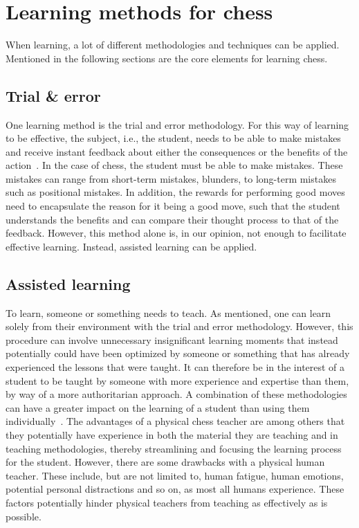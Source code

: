 \section{Learning methods for chess}\label{sec:learning-methods-for-chess}

When learning, a lot of different methodologies and techniques can be applied.
Mentioned in the following sections are the core elements for learning chess.


\subsection{Trial \& error}\label{subsec:trial-and-error}

One learning method is the trial and error methodology.
For this way of learning to be effective, the subject, i.e., the student, needs to be able to make mistakes and receive
instant feedback about either the consequences or the benefits of the action~\cite{li2023}.
In the case of chess, the student must be able to make mistakes.
These mistakes can range from short-term mistakes, blunders, to long-term mistakes such as positional mistakes.
In addition, the rewards for performing good moves need to encapsulate the reason for it being a good move, such that
the student understands the benefits and can compare their thought process to that of the feedback.
However, this method alone is, in our opinion, not enough to facilitate effective learning.
Instead, assisted learning can be applied.


\subsection{Assisted learning}\label{subsec:assisted-learning}

To learn, someone or something needs to teach.
As mentioned, one can learn solely from their environment with the trial and error methodology.
However, this procedure can involve unnecessary insignificant learning moments that instead potentially could have been
optimized by someone or something that has already experienced the lessons that were taught.
It can therefore be in the interest of a student to be taught by someone with more experience and expertise than them,
by way of a more authoritarian approach.
A combination of these methodologies can have a greater impact on the learning of a student than using them
individually~\cite{swann2012}.
The advantages of a physical chess teacher are among others that they potentially have experience in both the material
they are teaching and in teaching methodologies, thereby streamlining and focusing the learning process for the student.
However, there are some drawbacks with a physical human teacher.
These include, but are not limited to, human fatigue, human emotions, potential personal distractions and so on,
as most all humans experience.
These factors potentially hinder physical teachers from teaching as effectively as is possible.

